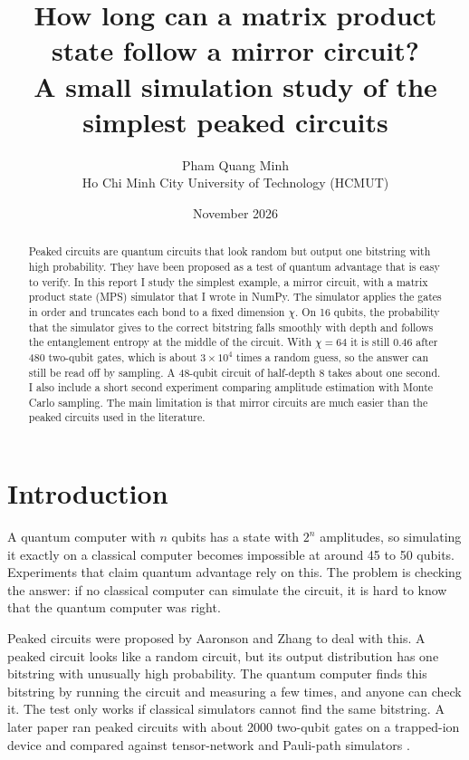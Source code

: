 \documentclass[11pt,a4paper]{article}
\title{\textbf{How long can a matrix product state follow a mirror circuit?}\\[0.3em]
\large A small simulation study of the simplest peaked circuits}
\author{Pham Quang Minh\\
\small Ho Chi Minh City University of Technology (HCMUT)\\
}
\date{November 2026}
\begin{document}
\maketitle

\begin{abstract}
\noindent Peaked circuits are quantum circuits that look random but output one bitstring with
high probability. They have been proposed as a test of quantum advantage that is easy to
verify. In this report I study the simplest example, a mirror circuit, with a matrix product
state (MPS) simulator that I wrote in NumPy. The simulator applies the gates in order and
truncates each bond to a fixed dimension $\chi$. On 16 qubits, the probability that the
simulator gives to the correct bitstring falls smoothly with depth and follows the
entanglement entropy at the middle of the circuit. With $\chi=64$ it is still $0.46$ after
480 two-qubit gates, which is about $3\times10^{4}$ times a random guess, so the answer can
still be read off by sampling. A 48-qubit circuit of half-depth 8 takes about one second.
I also include a short second experiment comparing amplitude estimation with Monte Carlo
sampling. The main limitation is that mirror circuits are much easier than the peaked
circuits used in the literature.
\end{abstract}

\section{Introduction}

A quantum computer with $n$ qubits has a state with $2^n$ amplitudes, so simulating it
exactly on a classical computer becomes impossible at around 45 to 50 qubits. Experiments
that claim quantum advantage rely on this. The problem is checking the answer: if no
classical computer can simulate the circuit, it is hard to know that the quantum computer
was right.

Peaked circuits were proposed by Aaronson and Zhang \cite{aaronson2024} to deal with this.
A peaked circuit looks like a random circuit, but its output distribution has one bitstring
with unusually high probability. The quantum computer finds this bitstring by running the
circuit and measuring a few times, and anyone can check it. The test only works if classical
simulators cannot find the same bitstring. A later paper ran peaked circuits with about
2000 two-qubit gates on a trapped-ion device and compared against tensor-network and
Pauli-path simulators \cite{gharibyan2025}.
\end{document}
